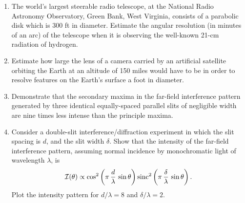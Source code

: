 {\begin{enumerate}
 \item The world's largest steerable  radio telescope, at the National Radio  Astronomy Observatory, Green Bank, West Virginia,
consists of  a parabolic disk which is 300 ft in diameter. Estimate the angular resolution (in minutes of an arc) of the telescope when it is
observing the well-known 21-cm
 radiation of hydrogen.
 
 \item Estimate how large  the lens of a camera carried by an artificial satellite orbiting the Earth at an altitude of 150 miles
would  have to be in order to resolve features on the Earth's surface a foot in diameter.
 
 \item Demonstrate that the secondary maxima in the far-field interference pattern generated by three identical equally-spaced parallel slits of
 negligible width are nine times less  intense than the principle maxima. 
 
\item Consider a double-slit interference/diffraction experiment in which the slit spacing is $d$, and the  slit width  $\delta$.
Show that the intensity of the far-field interference pattern, assuming normal incidence by monochromatic
 light of wavelength $\lambda$, is
 $$
 {\cal I}(\theta)\propto \cos^2\left(\pi\,\frac{d}{\lambda}\,\sin\theta\right){\rm sinc}^2\left(\pi\,\frac{\delta}{\lambda}\,\sin\theta\right).
 $$
 Plot the intensity pattern for $d/\lambda=8$ and $\delta/\lambda= 2$. 
 
\end{enumerate}}